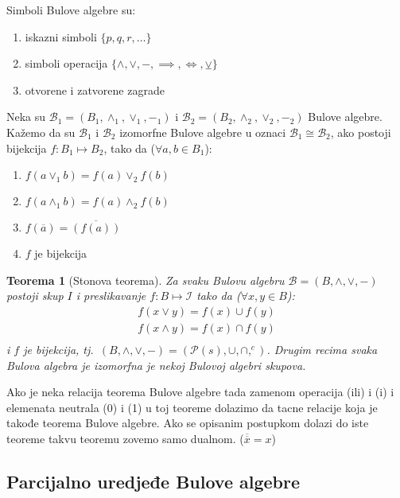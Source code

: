 \documentclass[12p,14paper]{article}
\newtheorem*{theorem}{Teorema}
\begin{document}
\begin{multicols}{2}
    Simboli Bulove algebre su:
    \begin{enumerate}
        \itemsep0em
        \item iskazni simboli $\{ p, q, r, \ldots \}$
        \item simboli operacija $\{ \land, \lor, -, \implies, \iff, \veebar \}$
        \item otvorene i zatvorene zagrade
    \end{enumerate}

    Neka su $\mathcal{B}_1 = (B_1, \land_1, \lor_1, -_1)$ i 
    $\mathcal{B}_2 = (B_2, \land_2, \lor_2, -_2)$ Bulove algebre. Kažemo da su 
    $\mathcal{B}_1$ i $\mathcal{B}_2$ izomorfne Bulove algebre u oznaci 
    $\mathcal{B}_1 \cong \mathcal{B}_2$, ako postoji bijekcija $f : B_1 \mapsto B_2$, tako da ($\forall a, b \in B_1$):
    \begin{enumerate}{}
        \itemsep0em
        \item $f(a \lor_1 b) = f(a) \lor_2 f(b)$
        \item $f(a \land_1 b) = f(a) \land_2 f(b)$
        \item $f(\overline{a}) = \overline{(f(a))}$
        \item $f$ je bijekcija
    \end{enumerate}

    \begin{theorem}[Stonova teorema]
        Za svaku Bulovu algebru $\mathcal{B} = (B, \land, \lor, -)$ postoji 
        skup $I$ i preslikavanje $f : B \mapsto \mathcal{I}$ tako da 
        ($\forall x,y \in B$):
        \begin{align*}
            f(x \lor y) = f(x) \cup f(y) \\
            f(x \land y) = f(x) \cap f(y) \\
        \end{align*}
        i $f$ je bijekcija, tj.\ 
        $(B, \land, \lor, -) = (\mathcal{P}(s), \cup, \cap, ^{c})$.
        Drugim recima svaka Bulova algebra je izomorfna je nekoj Bulovoj
        algebri skupova.
    \end{theorem}

    Ako je neka relacija teorema Bulove algebre tada zamenom operacija (ili) i 
    (i) i elemenata neutrala (0) i (1) u toj teoreme dolazimo da tacne 
    relacije koja je takođe teorema Bulove algebre. Ako se opisanim postupkom 
    dolazi do iste teoreme takvu teoremu zovemo samo dualnom. 
    ($\overline{\overline{x}} = x$)

\subsection{Parcijalno uredjeđe Bulove algebre}


\end{multicols}
\end{document}
